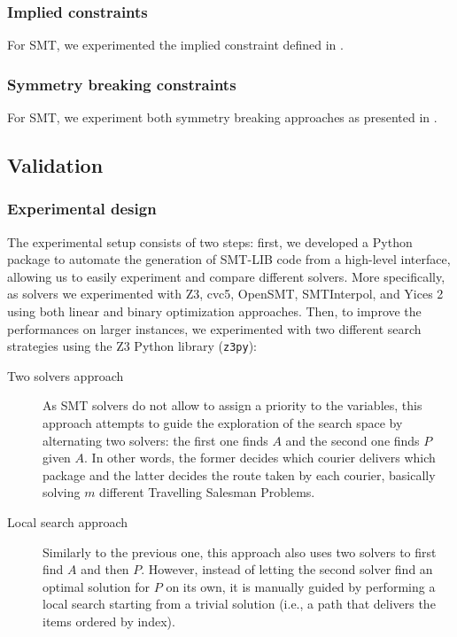 \subsubsection{Implied constraints}
For SMT, we experimented the implied constraint defined in .


\subsubsection{Symmetry breaking constraints}
For SMT, we experiment both symmetry breaking approaches as presented in .



\subsection{Validation}


\subsubsection{Experimental design}

The experimental setup consists of two steps: first, we developed a Python package to automate the generation of SMT-LIB code from a high-level interface, allowing us to easily experiment and compare different solvers. More specifically, as solvers we experimented with Z3, cvc5, OpenSMT, SMTInterpol, and Yices 2 using both linear and binary optimization approaches. Then, to improve the performances on larger instances, we experimented with two different search strategies using the Z3 Python library (\texttt{z3py}):
\begin{description}
    \item[Two solvers approach]
        As SMT solvers do not allow to assign a priority to the variables, this approach attempts to guide the exploration of the search space by alternating two solvers: the first one finds $A$ and the second one finds $P$ given $A$. In other words, the former decides which courier delivers which package and the latter decides the route taken by each courier, basically solving $m$ different Travelling Salesman Problems. 

    \item[Local search approach]
        Similarly to the previous one, this approach also uses two solvers to first find $A$ and then $P$. However, instead of letting the second solver find an optimal solution for $P$ on its own, it is manually guided by performing a local search starting from a trivial solution (i.e., a path that delivers the items ordered by index).
\end{description}


